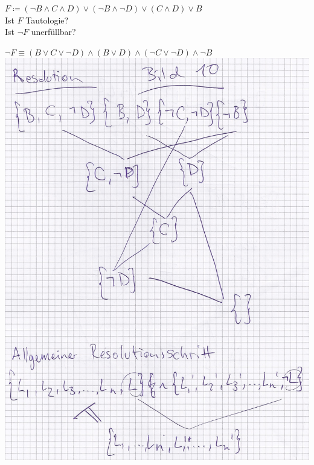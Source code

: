 \begin{bsp*}
	$F \coloneqq ( \neg B \wedge C \wedge D ) \vee ( \neg B \wedge \neg D ) \vee ( C \wedge D ) \vee B$ \\
	Ist $F$ Tautologie? \\
	Ist $\neg F$ unerfüllbar? \\
	\begin{bew}
		$\neg F \equiv ( B \vee C \vee \neg D ) \wedge ( B \vee D ) \wedge ( \neg C \vee \neg D ) \wedge \neg B$ \\
		\includegraphics[width=\textwidth]{Bild12}
	\end{bew}
\end{bsp*}

